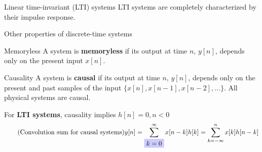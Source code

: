 \documentclass[10pt, handout]{beamer}
\begin{document}
%
\begin{frame}[t]{Linear time-invariant (LTI) systems}
LTI systems are completely characterized by their impulse response.

\begin{figure}
	\centering
	\vspace{-0.25cm}
	\resizebox{0.9\linewidth}{!}{}
	\label{fig:DTimp}
\end{figure}
\vspace{-0.5cm}

\end{frame}

\begin{frame}{Other properties of discrete-time systems}

\begin{block}{Memoryless}
	A system is \textbf{memoryless} if its output at time $n$, $y[n]$,  depends only on the present input $x[n]$.
\end{block}

\begin{block}{Causality}
	A system is \textbf{causal} if its output at time $n$, $y[n]$, depends only on the present and past samples of the input $\{x[n], x[n-1], x[n-2], \ldots\}$. All physical systems are causal.
	\vspace{0.5cm}
	
	For \textbf{LTI systems}, causality implies $h[n] = 0, n < 0$
	\begin{equation*}\tag{Convolution sum for causal systems}
	y[n] = \sum_{\tikz[baseline]{
			\node[fill=blue!20,anchor=base] (t1) {$k=0$};}}^{\infty} x[n-k]h[k] = \sum_{k=-\infty}^{n} x[k]h[n-k]
	\end{equation*}
	
\end{block}

\end{frame}
\end{document}
